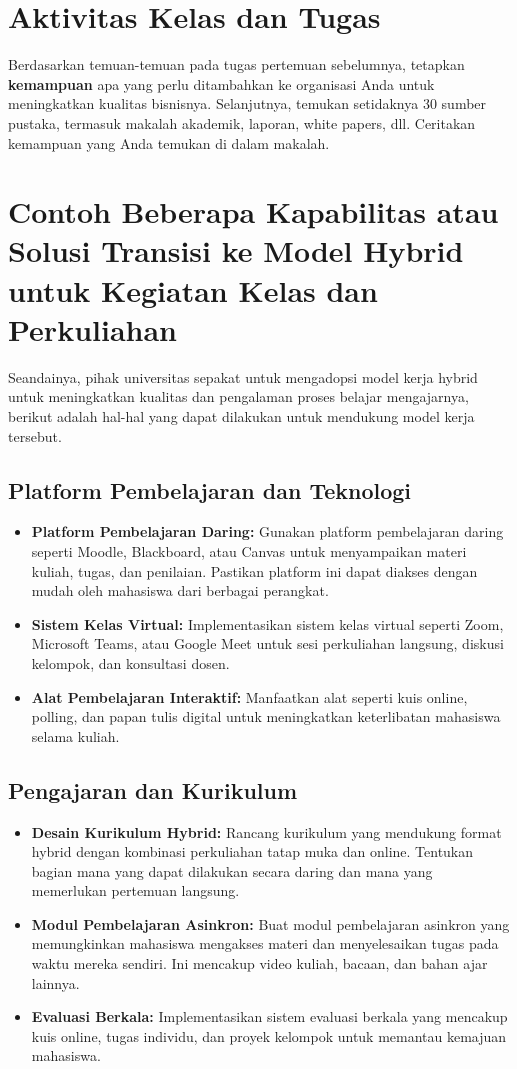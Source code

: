 \section{Aktivitas Kelas dan Tugas}
Berdasarkan temuan-temuan pada tugas pertemuan sebelumnya, tetapkan \textbf{kemampuan} apa yang perlu ditambahkan ke organisasi Anda untuk meningkatkan kualitas bisnisnya. Selanjutnya, temukan setidaknya 30 sumber pustaka, termasuk makalah akademik, laporan, white papers, dll. Ceritakan kemampuan yang Anda temukan di dalam makalah.

\section{Contoh Beberapa Kapabilitas atau Solusi Transisi ke Model Hybrid untuk Kegiatan Kelas dan Perkuliahan}

Seandainya, pihak universitas sepakat untuk mengadopsi model kerja hybrid untuk meningkatkan kualitas dan pengalaman proses belajar mengajarnya, berikut adalah hal-hal yang dapat dilakukan untuk mendukung model kerja tersebut.

\subsection{Platform Pembelajaran dan Teknologi}
\begin{itemize}
	\item \textbf{Platform Pembelajaran Daring:} Gunakan platform pembelajaran daring seperti Moodle, Blackboard, atau Canvas untuk menyampaikan materi kuliah, tugas, dan penilaian. Pastikan platform ini dapat diakses dengan mudah oleh mahasiswa dari berbagai perangkat.
	\item \textbf{Sistem Kelas Virtual:} Implementasikan sistem kelas virtual seperti Zoom, Microsoft Teams, atau Google Meet untuk sesi perkuliahan langsung, diskusi kelompok, dan konsultasi dosen.
	\item \textbf{Alat Pembelajaran Interaktif:} Manfaatkan alat seperti kuis online, polling, dan papan tulis digital untuk meningkatkan keterlibatan mahasiswa selama kuliah.
\end{itemize}

\subsection{Pengajaran dan Kurikulum}
\begin{itemize}
	\item \textbf{Desain Kurikulum Hybrid:} Rancang kurikulum yang mendukung format hybrid dengan kombinasi perkuliahan tatap muka dan online. Tentukan bagian mana yang dapat dilakukan secara daring dan mana yang memerlukan pertemuan langsung.
	\item \textbf{Modul Pembelajaran Asinkron:} Buat modul pembelajaran asinkron yang memungkinkan mahasiswa mengakses materi dan menyelesaikan tugas pada waktu mereka sendiri. Ini mencakup video kuliah, bacaan, dan bahan ajar lainnya.
	\item \textbf{Evaluasi Berkala:} Implementasikan sistem evaluasi berkala yang mencakup kuis online, tugas individu, dan proyek kelompok untuk memantau kemajuan mahasiswa.
\end{itemize}

